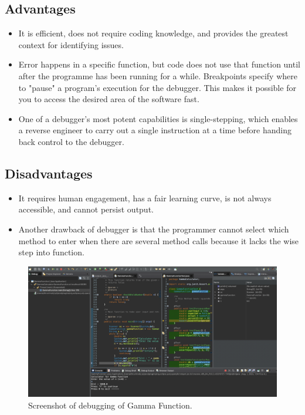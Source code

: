 \documentclass[a4paper, 11pt]{article}
\begin{document}
\subsection{Advantages}
\begin{itemize}
    
    \item{It is efficient, does not require coding knowledge, and provides the greatest context for identifying issues.}
    
    \item{Error happens in a specific function, but code does not use that function until after the programme has been running for a while. Breakpoints specify where to "pause" a program's execution for the debugger. This makes it possible for you to access the desired area of the software fast.}
    
    \item{One of a debugger's most potent capabilities is single-stepping, which enables a reverse engineer to carry out a single instruction at a time before handing back control to the debugger.}
\end{itemize}

\subsection{Disadvantages}
\begin{itemize}
    \item{It requires human engagement, has a fair learning curve, is not always accessible, and cannot persist output.}
    
    \item{Another drawback of debugger is that the programmer cannot select which method to enter when there are several method calls because it lacks the wise step into function.}
\end{itemize}

\begin{figure}[h]
    \centering
    \includegraphics[width=0.9\linewidth]{Images/Debugger.jpg}
    \caption{Screenshot of debugging of Gamma Function.}
    \label{fig:Debugger}
\end{figure}
\end{document}
